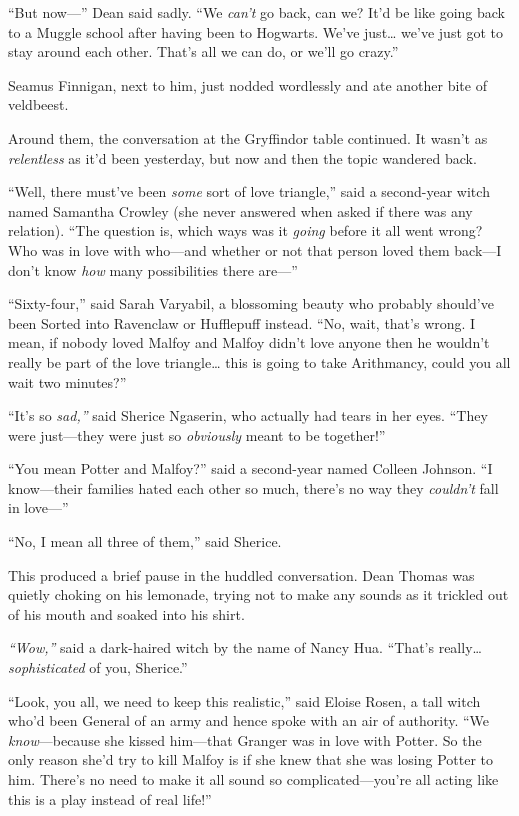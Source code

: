 ``But now---'' Dean said sadly. ``We \emph{can't} go back, can we? It'd
be like going back to a Muggle school after having been to Hogwarts.
We've just\ldots{} we've just got to stay around each other. That's all
we can do, or we'll go crazy.''

Seamus Finnigan, next to him, just nodded wordlessly and ate another
bite of veldbeest.

Around them, the conversation at the Gryffindor table continued. It
wasn't as \emph{relentless} as it'd been yesterday, but now and then the
topic wandered back.

``Well, there must've been \emph{some} sort of love triangle,'' said a
second-year witch named Samantha Crowley (she never answered when asked
if there was any relation). ``The question is, which ways was it
\emph{going} before it all went wrong? Who was in love with who---and
whether or not that person loved them back---I don't know \emph{how}
many possibilities there are---''

``Sixty-four,'' said Sarah Varyabil, a blossoming beauty who probably
should've been Sorted into Ravenclaw or Hufflepuff instead. ``No, wait,
that's wrong. I mean, if nobody loved Malfoy and Malfoy didn't love
anyone then he wouldn't really be part of the love triangle\ldots{} this
is going to take Arithmancy, could you all wait two minutes?''

``It's so \emph{sad,''} said Sherice Ngaserin, who actually had tears in
her eyes. ``They were just---they were just so \emph{obviously} meant to
be together!''

``You mean Potter and Malfoy?'' said a second-year named Colleen
Johnson. ``I know---their families hated each other so much, there's no
way they \emph{couldn't} fall in love---''

``No, I mean all three of them,'' said Sherice.

This produced a brief pause in the huddled conversation. Dean Thomas was
quietly choking on his lemonade, trying not to make any sounds as it
trickled out of his mouth and soaked into his shirt.

\emph{``Wow,''} said a dark-haired witch by the name of Nancy Hua.
``That's really\ldots{} \emph{sophisticated} of you, Sherice.''

``Look, you all, we need to keep this realistic,'' said Eloise Rosen, a
tall witch who'd been General of an army and hence spoke with an air of
authority. ``We \emph{know}---because she kissed him---that Granger was
in love with Potter. So the only reason she'd try to kill Malfoy is if
she knew that she was losing Potter to him. There's no need to make it
all sound so complicated---you're all acting like this is a play instead
of real life!''

